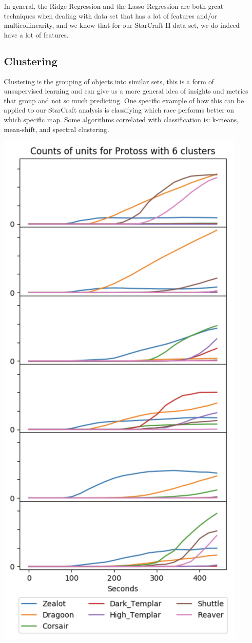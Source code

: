 \documentclass[a4paper,12pt]{report}
\begin{document}
In general, the Ridge Regression and the Lasso Regression are both great techniques when dealing with data set that has a lot of features and/or multicollinearity, and we know that for our StarCraft II data set, we do indeed have a lot of features.

\subsection{Clustering}
Clustering is the grouping of objects into similar sets, this is a form of unsupervised learning and can give us a more general idea of insights and metrics that group and not so much predicting. One specific example of how this can be applied to our StarCraft analysis is classifying which race performs better on which specific map. Some algorithms correlated with classification is: k-means, mean-shift, and spectral clustering.

\begin{center}
    \captionsetup{type=figure}
    \includegraphics[width=.5\linewidth]{media/cluster.png}
    \label{fig:cluster}
\end{center}
\end{document}
